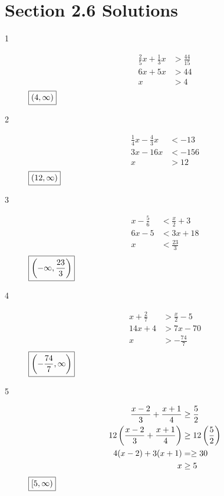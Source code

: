 \documentclass[letterpaper, landscape]{exam}
\begin{document}
  \ifprintanswers{}

    \newpage

    \section{Section 2.6 Solutions} 

    \begin{description}

      \item[1] 
        \begin{align*}
          \frac{2}{5} x + \frac{1}{3} x & > \frac{44}{15} \\
          6x + 5x                       & > 44 \\
          x                             & > 4 \\
        \end{align*}
        $\boxed{ \intoo{ 4, \infty } }$

      \item[2] 
        \begin{align*}
          \frac{1}{4} x - \frac{4}{3} x & < -13 \\
          3 x - 16 x                    & < -156 \\
          x                             & > 12 \\
        \end{align*}
        $\boxed{ \intoo{ 12, \infty } }$

      \item[3] 
        \begin{align*}
          x - \frac{5}{6} & < \frac{x}{2} + 3 \\
          6x - 5          & < 3x + 18 \\
          x               & < \frac{23}{3} \\
        \end{align*}
        $\boxed{ \intoo{ -\infty, \frac{23}{3} } }$

      \item[4] 
        \begin{align*}
          x + \frac{2}{7} & > \frac{x}{2} - 5 \\
          14x + 4         & > 7x - 70 \\
          x               & > - \frac{74}{7} \\
        \end{align*}
        $\boxed{ \intoo{ - \frac{74}{7}, \infty } }$

      \item[5]
        \begin{align*}
          \frac{x-2}{3} + \frac{x+1}{4}          & \geq \frac{5}{2} \\
          12 \del{\frac{x-2}{3} + \frac{x+1}{4}} & \geq 12 \del{\frac{5}{2}} \\
          4 (x - 2) + 3(x + 1)                   & = \geq 30 \\
          x                                      & \geq 5 \\
        \end{align*}
        $\boxed{ \intco{ 5, \infty } }$


\end{description}
\end{document}
